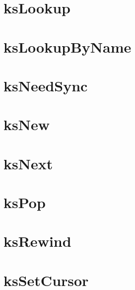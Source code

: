 \let\mypdfximage\pdfximage\def\pdfximage{\immediate\mypdfximage}\documentclass[twoside]{book}
\newcommand{\+}{\discretionary{\mbox{\scriptsize$\hookleftarrow$}}{}{}}
\begin{document}
\chapter{ks\+Lookup}
\label{doc_contrib_api_reviews_core_ksLookup_md}

\chapter{ks\+Lookup\+By\+Name}
\label{doc_contrib_api_reviews_core_ksLookupByName_md}

\chapter{ks\+Need\+Sync}
\label{doc_contrib_api_reviews_core_ksNeedSync_md}

\chapter{ks\+New}
\label{doc_contrib_api_reviews_core_ksNew_md}

\chapter{ks\+Next}
\label{doc_contrib_api_reviews_core_ksNext_md}

\chapter{ks\+Pop}
\label{doc_contrib_api_reviews_core_ksPop_md}

\chapter{ks\+Rewind}
\label{doc_contrib_api_reviews_core_ksRewind_md}

\chapter{ks\+Set\+Cursor}
\label{doc_contrib_api_reviews_core_ksSetCursor_md}

\end{document}
